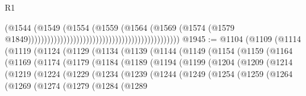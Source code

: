 \begin{lexlean}{R1}
\begin{coremodule}
{{{{{{{{{{{{{{{{{{{{{{{{{{{{{{{{{{{{{{{{                                                                                  (@1544
                                                                                    (@1549
                                                                                      (@1554
                                                                                        (@1559
                                                                                          (@1564
                                                                                            (@1569
                                                                                              (@1574
                                                                                                (@1579
                                                                                                  @1849)))))))))))))))))))))))))))))))))))))))))))))))
@1945 := @1104
    (@1109
      (@1114
        (@1119
          (@1124
            (@1129
              (@1134
                (@1139
                  (@1144
                    (@1149
                      (@1154
                        (@1159
                          (@1164
                            (@1169
                              (@1174
                                (@1179
                                  (@1184
                                    (@1189
                                      (@1194
                                        (@1199
                                          (@1204
                                            (@1209
                                              (@1214
                                                (@1219
                                                  (@1224
                                                    (@1229
                                                      (@1234
                                                        (@1239
                                                          (@1244
                                                            (@1249
                                                              (@1254
                                                                (@1259
                                                                  (@1264
                                                                    (@1269
                                                                      (@1274
                                                                        (@1279
                                                                          (@1284
                                                                            (@1289
}}}}}}}}}}}}}}}}}}}}}}}}}}}}}}}}}}}}}}}}
\end{coremodule}
\end{lexlean}

